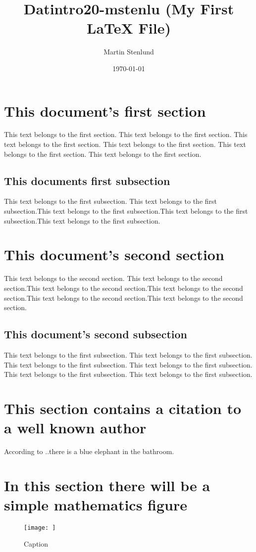 \documentclass[a4paper]{article}
\title{Datintro20-mstenlu (My First LaTeX File)}
\author{Martin Stenlund}
\date{\today}
\begin{document}
\maketitle
\tableofcontents

\section[Section 1]{This document's first section}
This text belongs to the first section. This text belongs to the first section. This text belongs to the first section. This text belongs to the first section. This text belongs to the first section. This text belongs to the first section. 
\subsection{This documents first subsection}
This text belongs to the first subsection. This text belongs to the first subsection.This text belongs to the first subsection.This text belongs to the first subsection.This text belongs to the first subsection.

\section[Section 1]{This document's second section}
This text belongs to the second section. This text belongs to the second section.This text belongs to the second section.This text belongs to the second section.This text belongs to the second section.This text belongs to the second section.
\subsection{This document's second subsection}
This text belongs to the first subsection. This text belongs to the first subsection. This text belongs to the first subsection. This text belongs to the first subsection. This text belongs to the first subsection. This text belongs to the first subsection. 


\section[Section 3]{This section contains a citation to a well known author}
According to 
\textcite{Knuth}..there is a blue elephant in the bathroom.

\section[Section 4]{In this section there will be a simple mathematics figure}

\begin{figure}
    \centering
    \texttt{[image: ]}
    \caption{Caption}
    \label{fig:my_label}
\end{figure}




\printbibliography
\end{document}
